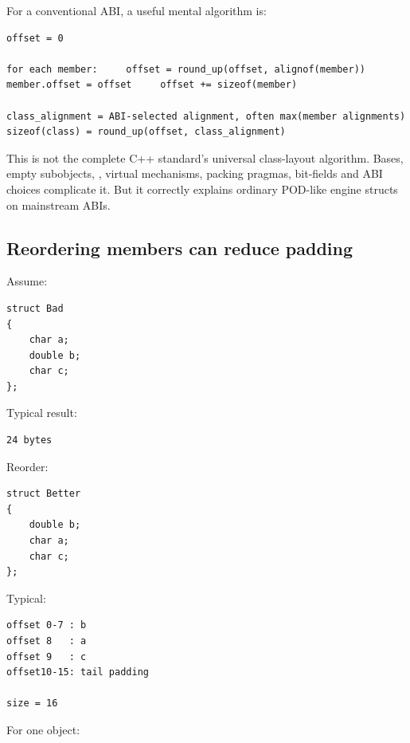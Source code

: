 \hypertarget{05-engine-i-ch003-typical-alignment-calculation}{}

For a conventional ABI, a useful mental algorithm is:

\begin{verbatim}
offset = 0

for each member:     offset = round_up(offset, alignof(member))     member.offset = offset     offset += sizeof(member)

class_alignment = ABI-selected alignment, often max(member alignments)
sizeof(class) = round_up(offset, class_alignment)
\end{verbatim}

This is not the complete C++ standard's universal class-layout algorithm. Bases, empty subobjects, , virtual mechanisms, packing pragmas, bit-fields and ABI choices complicate it. But it correctly explains ordinary POD-like engine structs on mainstream ABIs.

\subsection{Reordering members can reduce padding}\label{05-engine-i-ch003-reordering-members-can-reduce-padding}

\hypertarget{05-engine-i-ch003-reordering-members-can-reduce-padding}{}

Assume:

\begin{verbatim}
struct Bad
{
    char a;
    double b;
    char c;
};
\end{verbatim}

Typical result:

\begin{verbatim}
24 bytes
\end{verbatim}

Reorder:

\begin{verbatim}
struct Better
{
    double b;
    char a;
    char c;
};
\end{verbatim}

Typical:

\begin{verbatim}
offset 0-7 : b
offset 8   : a
offset 9   : c
offset10-15: tail padding

size = 16
\end{verbatim}

For one object:

